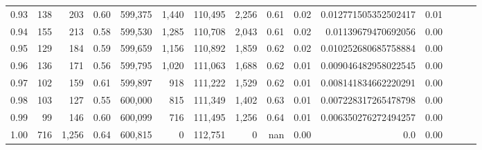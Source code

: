 \begin{tabular}{rrrrrrrrrrrrrrr}
0.93 &     138 &    203 &  0.60 &  599,375 &    1,440 &  110,495 &    2,256 &  0.61 &  0.02 &  0.012771505352502417 &      0.01 \\
0.94 &     155 &    213 &  0.58 &  599,530 &    1,285 &  110,708 &    2,043 &  0.61 &  0.02 &   0.01139679470692056 &      0.00 \\
0.95 &     129 &    184 &  0.59 &  599,659 &    1,156 &  110,892 &    1,859 &  0.62 &  0.02 &  0.010252680685758884 &      0.00 \\
0.96 &     136 &    171 &  0.56 &  599,795 &    1,020 &  111,063 &    1,688 &  0.62 &  0.01 &  0.009046482958022545 &      0.00 \\
0.97 &     102 &    159 &  0.61 &  599,897 &      918 &  111,222 &    1,529 &  0.62 &  0.01 &  0.008141834662220291 &      0.00 \\
0.98 &     103 &    127 &  0.55 &  600,000 &      815 &  111,349 &    1,402 &  0.63 &  0.01 &  0.007228317265478798 &      0.00 \\
0.99 &      99 &    146 &  0.60 &  600,099 &      716 &  111,495 &    1,256 &  0.64 &  0.01 &  0.006350276272494257 &      0.00 \\
1.00 &     716 &  1,256 &  0.64 &  600,815 &        0 &  112,751 &        0 &   nan &  0.00 &                   0.0 &      0.00 \\
\bottomrule
\end{tabular}
